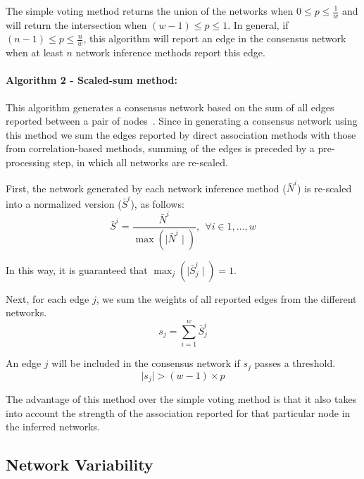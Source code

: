   The simple voting method returns the union of the networks when $0 \leq p \leq \frac{1}{w}$ and will return the intersection when $(w - 1) \leq p \leq 1$.
  In general, if $(n - 1) \leq p \leq \frac{n}{w}$, this algorithm will report an edge in the consensus network when at least $n$ network inference methods report this edge.


  \paragraph*{Algorithm 2 - Scaled-sum method:}

  This algorithm generates a consensus network based on the sum of all edges reported between a pair of nodes~\cite{bustinceFuzzySetsTheir2008,tsarevApplicationMajorityVoting2018}.
  Since in generating a consensus network using this method we sum the edges reported by direct association methods with those from correlation-based methods, summing of the edges is preceded by a pre-processing step, in which all networks are re-scaled.

  First, the network generated by each network inference method ($\bar{N}^i$) is re-scaled into a normalized version ($\bar{S}^i$), as follows:
  \begin{equation}
    \bar{S}^{i} = \frac{\bar{N}^{i}}{\max(\mid \bar{N}^{i} \mid)},~~\forall i \in {1, \dots, w}
    \label{eqn:scaled-sum-rescaling}
  \end{equation}

    In this way, it is guaranteed that $\max_{j}(\mid \bar{S}^i_j \mid) = 1$.


  Next, for each edge $j$, we sum the weights of all reported edges from the different networks.
  \begin{equation}
    s_j = \sum_{i=1}^{w} \bar{S}^i_j
    \label{eqn:scaled-sum}
  \end{equation}


  An edge $j$ will be included in the consensus network if $s_j$ passes a threshold.
  \begin{equation}
    \mid s_j \mid > (w - 1) \times p
    \label{eq:scaled-sum2}
  \end{equation}

  The advantage of this method over the simple voting method is that it also takes into account the strength of the association reported for that particular node in the inferred networks.

  \subsection*{Network Variability}

